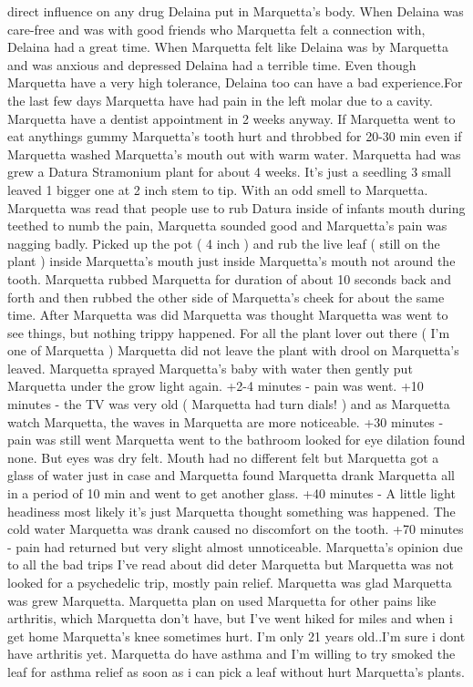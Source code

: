 \documentclass[12pt]{book}
\begin{document}
direct influence on any drug Delaina put in Marquetta's body. When Delaina was care-free and was with good friends who Marquetta felt a connection with, Delaina had a great time. When Marquetta felt like Delaina was by Marquetta and was anxious and depressed Delaina had a terrible time. Even though Marquetta have a very high tolerance, Delaina too can have a bad experience.For the last few days Marquetta have had pain in the left molar due to a cavity. Marquetta have a dentist appointment in 2 weeks anyway. If Marquetta went to eat anythings gummy Marquetta's tooth hurt and throbbed for 20-30 min even if Marquetta washed Marquetta's mouth out with warm water. Marquetta had was grew a Datura Stramonium plant for about 4 weeks. It's just a seedling 3 small leaved 1 bigger one at 2 inch stem to tip. With an odd smell to Marquetta. Marquetta was read that people use to rub Datura inside of infants mouth during teethed to numb the pain, Marquetta sounded good and Marquetta's pain was nagging badly. Picked up the pot ( 4 inch ) and rub the live leaf ( still on the plant ) inside Marquetta's mouth just inside Marquetta's mouth not around the tooth. Marquetta rubbed Marquetta for duration of about 10 seconds back and forth and then rubbed the other side of Marquetta's cheek for about the same time. After Marquetta was did Marquetta was thought Marquetta was went to see things, but nothing trippy happened. For all the plant lover out there ( I'm one of Marquetta ) Marquetta did not leave the plant with drool on Marquetta's leaved. Marquetta sprayed Marquetta's baby with water then gently put Marquetta under the grow light again. +2-4 minutes - pain was went. +10 minutes - the TV was very old ( Marquetta had turn dials! ) and as Marquetta watch Marquetta, the waves in Marquetta are more noticeable. +30 minutes - pain was still went Marquetta went to the bathroom looked for eye dilation found none. But eyes was dry felt. Mouth had no different felt but Marquetta got a glass of water just in case and Marquetta found Marquetta drank Marquetta all in a period of 10 min and went to get another glass. +40 minutes - A little light headiness most likely it's just Marquetta thought something was happened. The cold water Marquetta was drank caused no discomfort on the tooth. +70 minutes - pain had returned but very slight almost unnoticeable. Marquetta's opinion due to all the bad trips I've read about did deter Marquetta but Marquetta was not looked for a psychedelic trip, mostly pain relief. Marquetta was glad Marquetta was grew Marquetta. Marquetta plan on used Marquetta for other pains like arthritis, which Marquetta don't have, but I've went hiked for miles and when i get home Marquetta's knee sometimes hurt. I'm only 21 years old..I'm sure i dont have arthritis yet. Marquetta do have asthma and I'm willing to try smoked the leaf for asthma relief as soon as i can pick a leaf without hurt Marquetta's plants.
\end{document}
